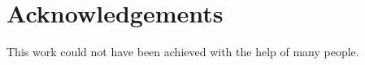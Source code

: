 \clearpage \chapter*{Acknowledgements}

This work could not have been achieved with the help of many people.

